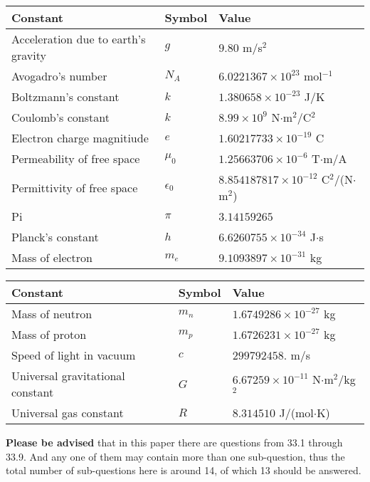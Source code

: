 \documentclass[12pt]{article}
\begin{document}
\noindent\begin{tabular}{|l|l|l|}
\hline
Constant & Symbol & Value \\
\hline
Acceleration due to earth's gravity &
$g$ &
 $ 9.80 $
m/s$^2$ \\
\hline
Avogadro's number &
$N_A$ &
 $ 6.0221367 \times 10^{23} $
mol$^{-1}$ \\
\hline
Boltzmann's constant &
$k$ &
 $ 1.380658 \times 10^{-23} $
J/K \\
\hline
Coulomb's constant &
$k$ &
 $ 8.99 \times 10^{9} $
N$\cdot $m$^2$/C$^2$ \\
\hline
Electron charge magnitiude &
$e$ &
 $ 1.60217733 \times 10^{-19} $
C \\
\hline
Permeability of free space &
$\mu _0$ &
 $ 1.25663706 \times 10^{-6} $
T$\cdot $m/A \\
\hline
Permittivity of free space &
$\epsilon _0$ &
 $ 8.854187817 \times 10^{-12} $
C$^2$/(N$\cdot $m$^2$) \\
\hline
Pi &
$\pi$ &
 $ 3.14159265 $
$ $ \\
\hline
Planck's constant &
$h$ &
 $ 6.6260755 \times 10^{-34} $
J$\cdot $s \\
\hline
Mass of electron &
$m_e$ &
 $ 9.1093897 \times 10^{-31} $
kg \\
\hline
\end{tabular}
 
 
\noindent\begin{tabular}{|l|l|l|}
\hline
Constant & Symbol & Value \\
\hline
Mass of neutron &
$m_n$ &
 $ 1.6749286 \times 10^{-27} $
kg \\
\hline
Mass of proton &
$m_p$ &
 $ 1.6726231 \times 10^{-27} $
kg \\
\hline
Speed of light in vacuum &
$c$ &
 $ 299792458. $
m/s \\
\hline
Universal gravitational constant &
$G$ &
 $ 6.67259 \times 10^{-11} $
N$\cdot $m$^2$/kg$^2$ \\
\hline
Universal gas constant &
$R$ &
 $ 8.314510 $
J/(mol$\cdot $K) \\
\hline
\end{tabular}
 
 
{\textbf{\large{Please be advised}}} that in this paper there are questions from
33.1 through
33.9.
And any one of them may contain more than one sub-question, thus the total number
of sub-questions here is around 14, of which
13 should be answered.
 
\vspace{0.3in}
 
\end{document}

